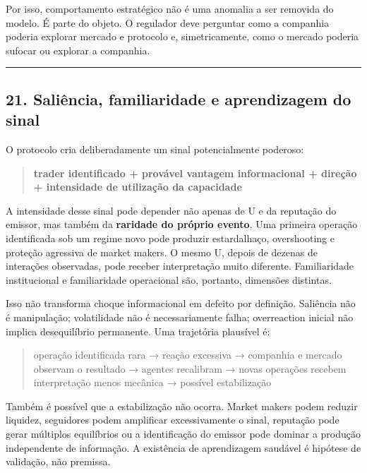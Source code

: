\documentclass[
  a4paper,
]{article}
\begin{document}
Por isso, comportamento estratégico não é uma anomalia a ser removida do
modelo. É parte do objeto. O regulador deve perguntar como a companhia
poderia explorar mercado e protocolo e, simetricamente, como o mercado
poderia sufocar ou explorar a companhia.

\begin{center}\rule{0.5\linewidth}{0.5pt}\end{center}

\hypertarget{21-o-risco-de-o-sinal-quebrar-o-mercado}{}

\hypertarget{21-saliuxeancia-familiaridade-e-aprendizagem-do-sinal}{%
\subsection{21. Saliência, familiaridade e aprendizagem do
sinal}\label{21-saliuxeancia-familiaridade-e-aprendizagem-do-sinal}}

O protocolo cria deliberadamente um sinal potencialmente poderoso:

\begin{quote}
\textbf{trader identificado + provável vantagem informacional + direção
+ intensidade de utilização da capacidade}
\end{quote}

A intensidade desse sinal pode depender não apenas de U e da reputação
do emissor, mas também da \textbf{raridade do próprio evento}. Uma
primeira operação identificada sob um regime novo pode produzir
estardalhaço, overshooting e proteção agressiva de market makers. O
mesmo U, depois de dezenas de interações observadas, pode receber
interpretação muito diferente. Familiaridade institucional e
familiaridade operacional são, portanto, dimensões distintas.

Isso não transforma choque informacional em defeito por definição.
Saliência não é manipulação; volatilidade não é necessariamente falha;
overreaction inicial não implica desequilíbrio permanente. Uma
trajetória plausível é:

\begin{quote}
operação identificada rara → reação excessiva → companhia e mercado
observam o resultado → agentes recalibram → novas operações recebem
interpretação menos mecânica → possível estabilização
\end{quote}

Também é possível que a estabilização não ocorra. Market makers podem
reduzir liquidez, seguidores podem amplificar excessivamente o sinal,
reputação pode gerar múltiplos equilíbrios ou a identificação do emissor
pode dominar a produção independente de informação. A existência de
aprendizagem saudável é hipótese de validação, não premissa.
\end{document}
